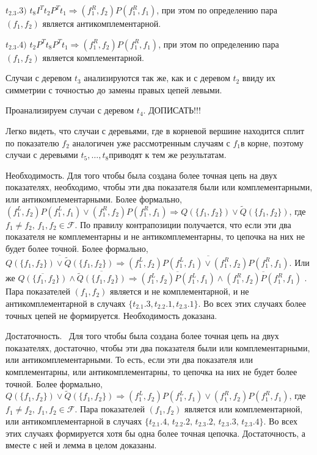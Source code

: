 \documentclass[12pt]{a&t}
\begin{document}
$t_2.3.3)$ $t_8 I^T t_2 P^T t_1 \Rightarrow (f_1^R, f_2)P(f_1^R, f_1) $, при этом по определению пара $(f_1, f_2)$ является антикомплементарной.

$t_2.3.4)$ $t_2 P^T t_8 P^T t_1 \Rightarrow (f_1^R, f_2)P(f_1^R, f_1) $, при этом по определению пара $(f_1, f_2)$ является комплементарной.

Случаи с деревом $t_3$ анализируются так же, как и с деревом $t_2$ ввиду их симметрии с точностью до замены правых цепей левыми.

Проанализируем случаи с деревом $t_4$. ДОПИСАТЬ!!!

Легко видеть, что случаи с деревьями, где в корневой вершине находится сплит по показателю $f_2$ аналогичен уже рассмотренным случаям с $f_1$в корне, поэтому случаи с деревьями $t_5, \ldots , t_8$приводят к тем же результатам.  

Необходимость. Для того чтобы была создана более точная цепь на двух показателях, необходимо, чтобы эти два показателя были или комплементарными, или антикомплементарными. Более формально, $(f_1^L, f_2)P(f_1^L, f_1) \lor (f_1^R, f_2)P(f_1^R, f_1) \Rightarrow Q(\{f_1, f_2 \}) \lor \widetilde{Q}(\{f_1, f_2 \}) $, где $ f_1 \neq f_2, \, f_1, f_2 \in \mathscr{F} $. По правилу контрапозиции получается, что если эти два показателя не комплементарны и не антикомплементарны, то цепочка на них не будет более точной. Более формально, $ \overline{Q(\{f_1, f_2 \}) \lor \widetilde{Q}(\{f_1, f_2 \})} \Rightarrow \overline{(f_1^L, f_2)P(f_1^L, f_1) \lor (f_1^R, f_2)P(f_1^R, f_1)} $. Или же $ \overline{Q(\{f_1, f_2 \})} \land \overline{ \widetilde{Q}(\{f_1, f_2 \})} \Rightarrow \overline{(f_1^L, f_2)P(f_1^L, f_1)} \land \overline{(f_1^R, f_2)P(f_1^R, f_1)} $ . Пара показателей $(f_1, f_2)$ является и не комплементарной, и не антикомплементарной в случаях $\{ t_2.1.3, t_2.2.1, t_2.3.1 \}$. Во всех этих случаях более точных цепей не формируется. Необходимость доказана.

Достаточность.  Для того чтобы была создана более точная цепь на двух показателях, достаточно, чтобы эти два показателя были или комплементарными, или антикомплементарными. То есть, если эти два показателя или комплементарны, или антикомплементарны, то цепочка на них не будет более точной.  Более формально, $ Q(\{f_1, f_2 \}) \lor \widetilde{Q}(\{f_1, f_2 \}) \Rightarrow (f_1^L, f_2)P(f_1^L, f_1) \lor (f_1^R, f_2)P(f_1^R, f_1) $, где $ f_1 \neq f_2, \, f_1, f_2 \in \mathscr{F} $. Пара показателей $(f_1, f_2)$ является или комплементарной, или антикомплементарной в случаях $\{ t_2.1.4, \, t_2.2.2, \, t_2.3.2, \, t_2.3.3, \, t_2.3.4 \}$. Во всех этих случаях формируется хотя бы одна более точная цепочка. Достаточность, а вместе с ней и лемма в целом доказаны.
\end{document}
